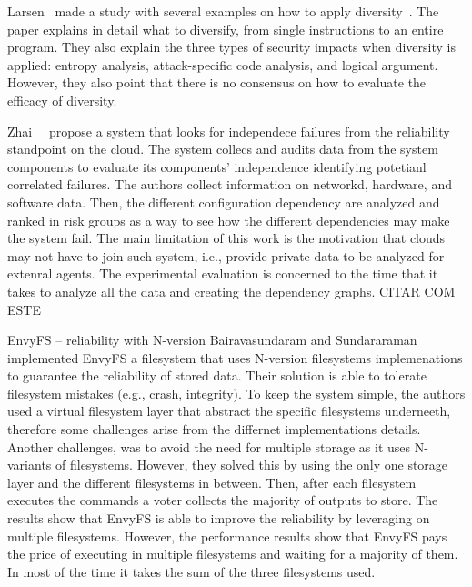 Larsen~\etal{} made a study with several examples on how to apply diversity~\cite{Larsen:2014,Larsen:2015}. 
The paper explains in detail what to diversify, from single instructions to an entire program. 
They also explain the three types of security impacts when diversity is applied: entropy analysis, attack-specific code analysis, and logical argument. 
However, they also point that there is no consensus on how to evaluate the efficacy of diversity. 


Zhai~\etal{}~\cite{Zhai:2014} propose a system that looks for independece failures from the reliability standpoint on the cloud.
The system collecs and audits data from the system components to evaluate its components' independence identifying potetianl correlated failures.
The authors collect information on networkd, hardware, and software data.
Then, the different configuration dependency are analyzed and ranked in risk groups as a way to see how the different dependencies may make the system fail.
The main limitation of this work is the motivation that clouds may not have to join such system, i.e., provide private data to be analyzed for extenral agents.
The experimental evaluation is concerned to the time that it takes to analyze all the data and creating the dependency graphs.
CITAR COM ESTE~\cite{George:2015}

EnvyFS -- reliability with N-version
Bairavasundaram and Sundararaman~\cite{Bairavasundaram:2009} implemented EnvyFS a filesystem that uses N-version filesystems implemenations to guarantee the reliability of stored data.
Their solution is able to tolerate filesystem mistakes (e.g., crash, integrity).
To keep the system simple, the authors used a virtual filesystem layer that abstract the specific filesystems underneeth, therefore some challenges arise from the differnet implementations details.
Another challenges, was to avoid the need for multiple storage as it uses N-variants of filesystems. 
However, they solved this by using the only one storage layer and the different filesystems in between. 
Then, after each filesystem executes the commands a voter collects the majority of outputs to store.
The results show that EnvyFS is able to improve the reliability by leveraging on multiple filesystems.
However, the performance results show that EnvyFS pays the price of executing in multiple filesystems and waiting for a majority of them. 
In most of the time it takes the sum of the three filesystems used.


